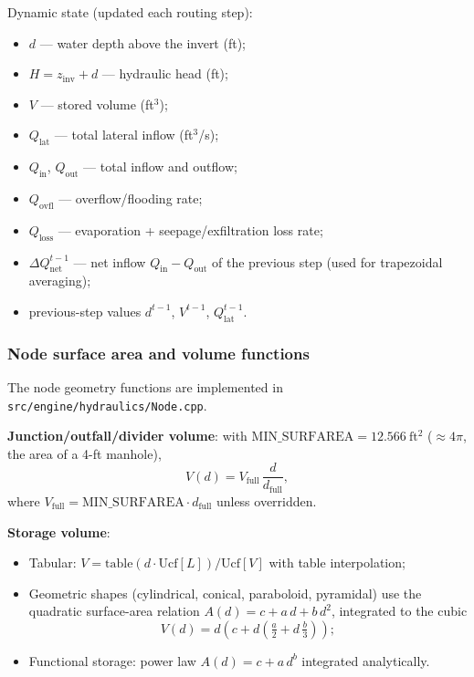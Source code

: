 \documentclass[11pt,a4paper]{article}
\newcommand{\sfft}{\mathrm{ft^2}}
\newcommand{\src}[1]{\texttt{src/engine/#1}}
\begin{document}
Dynamic state (updated each routing step):
\begin{itemize}[nosep]
  \item $d$ --- water depth above the invert (ft);
  \item $H = z_{\mathrm{inv}} + d$ --- hydraulic head (ft);
  \item $V$ --- stored volume (ft$^3$);
  \item $Q_{\mathrm{lat}}$ --- total lateral inflow (ft$^3$/s);
  \item $Q_{\mathrm{in}}$, $Q_{\mathrm{out}}$ --- total inflow and outflow;
  \item $Q_{\mathrm{ovfl}}$ --- overflow/flooding rate;
  \item $Q_{\mathrm{loss}}$ --- evaporation + seepage/exfiltration loss rate;
  \item $\Delta Q_{\mathrm{net}}^{t-1}$ --- net inflow $Q_{\mathrm{in}} -
        Q_{\mathrm{out}}$ of the previous step (used for trapezoidal
        averaging);
  \item previous-step values $d^{t-1}$, $V^{t-1}$, $Q_{\mathrm{lat}}^{t-1}$.
\end{itemize}

\subsubsection{Node surface area and volume functions}

The node geometry functions are implemented in \src{hydraulics/Node.cpp}.

\textbf{Junction/outfall/divider volume}: with $\mathrm{MIN\_SURFAREA} =
12.566\ \sfft$ ($\approx 4\pi$, the area of a 4-ft manhole),
\begin{equation}
  V(d) = V_{\mathrm{full}}\,\frac{d}{d_{\mathrm{full}}},
\end{equation}
where $V_{\mathrm{full}} = \mathrm{MIN\_SURFAREA}\cdot d_{\mathrm{full}}$
unless overridden.

\textbf{Storage volume}:
\begin{itemize}[nosep]
  \item Tabular: $V = \mathrm{table}(d\cdot \mathrm{Ucf}[L])/\mathrm{Ucf}[V]$
        with table interpolation;
  \item Geometric shapes (cylindrical, conical, paraboloid, pyramidal) use the
        quadratic surface-area relation $A(d) = c + a\,d + b\,d^{2}$, integrated
        to the cubic
        \begin{equation}
          V(d) = d\left(c + d\!\left(\tfrac{a}{2} + d\,\tfrac{b}{3}\right)\right);
        \end{equation}
  \item Functional storage: power law $A(d) = c + a\,d^{b}$ integrated
        analytically.
\end{itemize}
\end{document}

